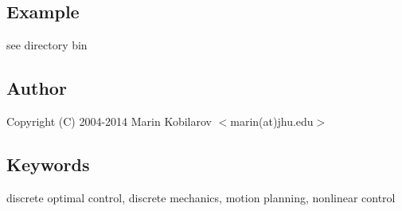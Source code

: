 \subsection{\-Example}\label{index_Example}
see directory bin \subsection{\-Author}\label{index_Author}
\-Copyright (\-C) 2004-\/2014 \-Marin \-Kobilarov $<$marin(at)jhu.\-edu$>$ \subsection{\-Keywords}\label{index_Keywords}
discrete optimal control, discrete mechanics, motion planning, nonlinear control 
